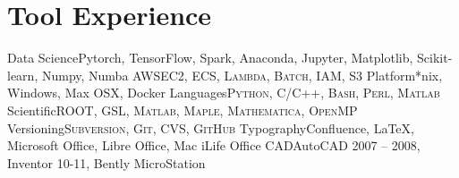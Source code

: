 \section{\textbf{Tool Experience}}
\cvcomputer
{Data Science}{Pytorch, TensorFlow, Spark, Anaconda, Jupyter, Matplotlib, Scikit-learn, Numpy, Numba}
{AWS}{\textsc{EC2, ECS, Lambda, Batch, IAM, S3}}
\cvcomputer
{Platform}{*nix, Windows, Max OSX, Docker} 
{Languages}{\textsc{Python, C/C++, Bash, Perl, Matlab}}
\cvcomputer
{Scientific}{\textsc{ROOT, GSL, Matlab, Maple, Mathematica, OpenMP}} 
{Versioning}{\textsc{Subversion, Git, CVS, GitHub}}
\cvcomputer
{Typography}{Confluence, \LaTeX, Microsoft Office, Libre Office, Mac iLife Office}
{CAD}{AutoCAD 2007 -- 2008, Inventor 10-11, Bently MicroStation}